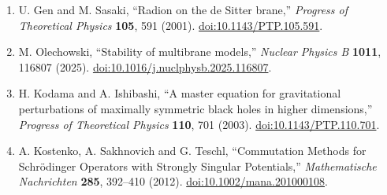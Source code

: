 \documentclass[
  11pt,
]{article}
\begin{document}
\begin{enumerate}
{  Review D} \textbf{70}, 085015 (2004).
  \href{https://doi.org/10.1103/PhysRevD.70.085015}{doi:10.1103/PhysRevD.70.085015}.
\item
  U. Gen and M. Sasaki, ``Radion on the de Sitter brane,''
  \emph{Progress of Theoretical Physics} \textbf{105}, 591 (2001).
  \href{https://doi.org/10.1143/PTP.105.591}{doi:10.1143/PTP.105.591}.
\item
  M. Olechowski, ``Stability of multibrane models,'' \emph{Nuclear
  Physics B} \textbf{1011}, 116807 (2025).
  \href{https://doi.org/10.1016/j.nuclphysb.2025.116807}{doi:10.1016/j.nuclphysb.2025.116807}.
\item
  H. Kodama and A. Ishibashi, ``A master equation for gravitational
  perturbations of maximally symmetric black holes in higher
  dimensions,'' \emph{Progress of Theoretical Physics} \textbf{110}, 701
  (2003).
  \href{https://doi.org/10.1143/PTP.110.701}{doi:10.1143/PTP.110.701}.
\item
  A. Kostenko, A. Sakhnovich and G. Teschl, ``Commutation Methods for
  Schrödinger Operators with Strongly Singular Potentials,''
  \emph{Mathematische Nachrichten} \textbf{285}, 392--410 (2012).
  \href{https://doi.org/10.1002/mana.201000108}{doi:10.1002/mana.201000108}.
\end{enumerate}
\end{document}
